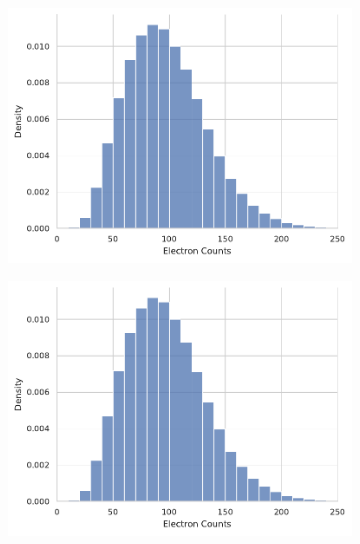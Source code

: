 \begin{figure}[h]
    \centering
    \begin{subfigure}[t]{0.49\linewidth}
        \centering
        \includegraphics[width=\linewidth]{images/hist_counts_per_train.pdf}
        \caption{}
        \label{fig:hist-grir-flash}
    \end{subfigure}
    \hfill
    \begin{subfigure}[t]{0.49\linewidth}
        \centering
        \includegraphics[width=\linewidth]{images/hist_counts_per_train.pdf}
        \caption{}
        \label{fig:hist-wse2-laser}
    \end{subfigure}
    \caption{}
    \label{fig:}
\end{figure}


